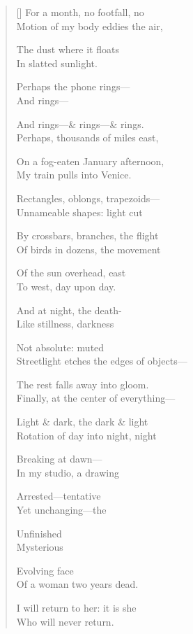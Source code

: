 \label{ch:absence}
\settowidth{\versewidth}{Streetlight etches the edges of objects---}
\begin{verse}[\versewidth]
For a month, no footfall, no\\
Motion of my body eddies the air,

The dust where it floats\\
In slatted sunlight.

Perhaps the phone rings---\\
And rings---

And rings---\& rings---\& rings.\\
Perhaps, thousands of miles east,

On a fog-eaten January afternoon,\\
My train pulls into Venice.

Rectangles, oblongs, trapezoids---\\
Unnameable shapes: light cut

By crossbars, branches, the flight\\
Of birds in dozens, the movement

Of the sun overhead, east\\
To west, day upon day.

And at night, the death-\\
Like stillness, darkness

Not absolute: muted\\
Streetlight etches the edges of objects---

The rest falls away into gloom.\\
Finally, at the center of everything---

Light \& dark, the dark \& light\\
Rotation of day into night, night

Breaking at dawn---\\
In my studio, a drawing

Arrested---tentative\\
Yet unchanging---the

Unfinished\\
Mysterious

Evolving face\\
Of a woman two years dead.

I will return to her: it is she\\
Who will never return.
\end{verse}
